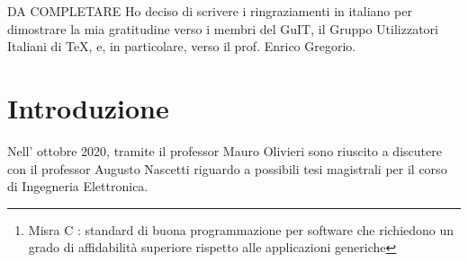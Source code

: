 \documentclass[LaM,binding=0.6cm]{../sapthesis}
\begin{document}
\begin{abstract}
L'ambiente spaziale ed in particolare zone del cosmo come le fasce di Van Allen rappresenta però una sfida per quanto riguarda problemi di consistenza della memoria dell'intero sistema. Le radiazioni cosmiche possono infatti generare corruzioni all'interno del firmware.

In questo lavoro sono state usate diverse tecniche software con l'obiettivo di rilevare e correggere eventuali errori e malfunzionamenti del sistema hardware: - utilizzo di ridondanza software (di copie dello stesso firmware), - protezione dell'informazione tramite algoritmi di rilevazione e correzione dell'errore, - diagnostica ed eventuale esclusione dei sottosistemi non correttamente funzionanti.

L'approccio utilizzato durante l'implementazione di ogni singola tecnica ha cercato di rispettare gli standard di programmazione utilizzati per questi ambiti specifici (in particolare lo standard "Misra C"\footnote{Misra C :  standard di buona programmazione per software che richiedono un grado di affidabilità superiore rispetto alle applicazioni generiche} )
ed inoltre ogni nuovo sviluppo ha superato una serie di test di valutazione delle prestazioni che di rispetto dei requisiti richiesti da questi tipi di applicazioni.

I risultati ottenuti durante la fase di testing dei diversi applicativi hanno determinato un sensibile irrobustimento di tutto il firmware. Sebbene non sia stato possibile determinare sul microcontrollore i fattori come il consumo di memoria e di tempo, data l'impossibilità di simulare una situazione reale di volo, l'architettura software è stato resa il più possibile scalabile in modo da determinare un compromesso tra i fattori precedentemente espressi e la protezione del sistema.
\end{abstract}

\begin{acknowledgments}
DA COMPLETARE
Ho deciso di scrivere i ringraziamenti in italiano
per dimostrare la mia gratitudine verso i membri
del GuIT, il Gruppo Utilizzatori Italiani di \TeX, e, in particolare,
verso il prof. Enrico Gregorio.
\end{acknowledgments}

\tableofcontents

\listoffigures

\listoftables

\chapter{Introduzione}
Nell' ottobre 2020, tramite il professor Mauro Olivieri sono riuscito a discutere con il professor Augusto Nascetti riguardo a possibili tesi magistrali per il corso di Ingegneria Elettronica. 
\end{document}

